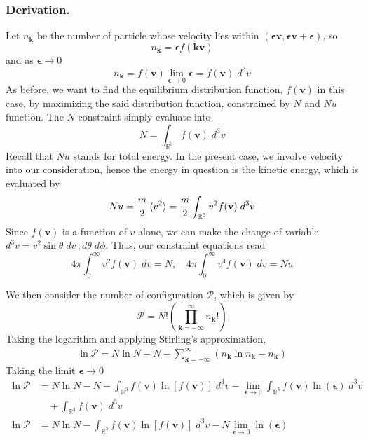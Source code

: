 \documentclass[../../../Main.tex]{subfiles}
\begin{document}
\subsubsection*{Derivation.} Let $n_\mathbf{k}$ be the number of particle whose velocity lies within $(\boldsymbol{\epsilon}\mathbf{v},\boldsymbol{\epsilon}\mathbf{v}+\boldsymbol{\epsilon})$, so
\begin{equation*}
    n_\mathbf{k}=\boldsymbol{\epsilon}f(\mathbf{kv})
\end{equation*}
and as $\boldsymbol{\epsilon}\rightarrow0$
\begin{equation*}
    n_\mathbf{k}=f(\mathbf{v})\lim_{\boldsymbol{\epsilon}\rightarrow0}\boldsymbol{\epsilon}=f(\mathbf{v})\;d^3v
\end{equation*}
As before, we want to find the equilibrium distribution function, $f(\mathbf{ v})$ in this case, by maximizing the said distribution function, constrained by $N$ and $Nu$ function. The $N$ constraint simply evaluate into 
\begin{equation*}
    N=\int_{\mathbb{R}^3}  f(\mathbf{v})\;d^3v
\end{equation*}
Recall that $Nu$ stands for total energy. In the present case, we involve velocity into our consideration, hence the energy in question is the kinetic energy, which is evaluated by
\begin{equation*}
    Nu=\frac{m}{2}\braket{v^2}=\frac{m}{2}\int_{\mathbb{R}^3} v^2f(\mathbf{v})\;d^3v
\end{equation*} 
Since $f(\mathbf{v})$ is a function of $v$ alone, we can make the change of variable $d^3v=v^2\sin\theta\;dv\,; d\theta\; d\phi$. Thus, our constraint equations read
\begin{equation*}
    4\pi\int_{0}^{\infty}v^2f(\mathbf{v})\;dv=N, \quad 4\pi \int_{0}^{\infty}v^4f(\mathbf{v})\;dv=Nu
\end{equation*}

We then consider the number of configuration $\mathcal{P}$, which is given by 
\begin{equation*}
    \mathcal{P}=N!\left(\prod_{\mathbf{k}=-\infty}^{\infty}n_\mathbf{k}!\right)
\end{equation*}
Taking the logarithm and applying Stirling's approximation,
\begin{align*}
    \ln \mathcal{P}=N\ln N-N-\sum_{\mathbf{k=-\infty}}^{\infty}\left(n_\mathbf{k}\ln n_\mathbf{k}-n_\mathbf{k} \right)
\end{align*}
Taking the limit $\boldsymbol{\epsilon}\rightarrow0$
\begin{align*}
    \ln \mathcal{P}&=N\ln N-N - \int_{\mathbb{R}^3}f(\mathbf{v})\ln [f(\mathbf{v})]\;d^3v - \lim_{\boldsymbol{\epsilon}\rightarrow0} \int_{\mathbb{R}^3}f(\mathbf{v})\ln (\boldsymbol{\epsilon})\;d^3v\\
    &\quad+\int_{\mathbb{R}^3}f(\mathbf{v})\;d^3v\\
    \ln \mathcal{P}&=N\ln N - \int_{\mathbb{R}^3}f(\mathbf{v})\ln [f(\mathbf{v})]\;d^3v -N\lim_{\boldsymbol{\epsilon}\rightarrow0}\ln (\boldsymbol{\epsilon})
\end{align*}
\end{document}
